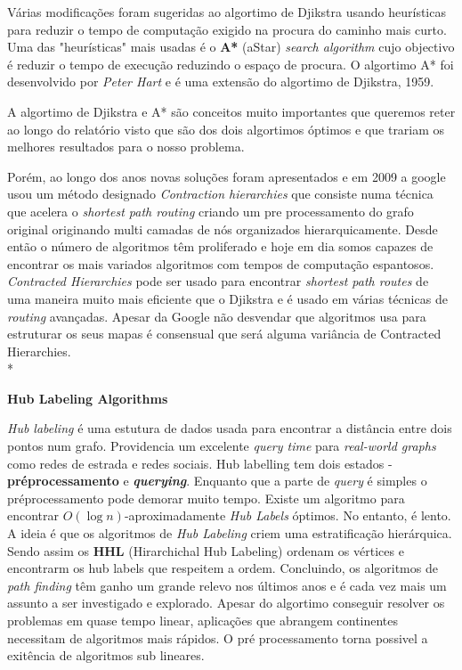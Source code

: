 \documentclass[a4paper]{article}
\begin{document}
\begin{small}

 Várias modificações foram sugeridas ao algortimo de Djikstra usando heurísticas para reduzir o tempo de computação exigido na procura do caminho mais curto. Uma das "heurísticas" mais usadas é o \textbf{A*} (aStar) \textit{search algorithm} cujo objectivo é reduzir o tempo de execução reduzindo o espaço de procura. O algortimo A* foi desenvolvido por \textit{Peter Hart} e é uma extensão do algortimo de Djikstra, 1959. 
 
 A algortimo de Djikstra e A* são conceitos muito importantes que queremos reter ao longo do relatório visto que são dos dois algortimos óptimos e que trariam os melhores resultados para o nosso problema. 
 
 Porém, ao longo dos anos novas soluções foram apresentados e em 2009 a google usou um método designado \textit{Contraction hierarchies} que consiste numa técnica que acelera o \textit{shortest path routing} criando um pre processamento do grafo original originando multi camadas de nós organizados hierarquicamente. Desde então o número de algoritmos têm proliferado e hoje em dia somos capazes de encontrar os mais variados algoritmos com tempos de computação espantosos. \textit{Contracted Hierarchies} pode ser usado para encontrar \textit{shortest path routes} de uma maneira muito mais eficiente que o Djikstra e é usado em várias técnicas de \textit{routing} avançadas. Apesar da Google não desvendar que algoritmos usa para estruturar os seus mapas é consensual que será alguma variância de Contracted Hierarchies. \\*
 \end{small}

 
 
\textbf{Hub Labeling Algorithms}


\begin{small}

\textit{Hub labeling} é uma estutura de dados usada para encontrar a distância entre dois pontos num grafo. Providencia um excelente \textit{query time} para \textit{real-world graphs} como redes de estrada e redes sociais. Hub labelling tem dois estados - \textbf{préprocessamento} e \textit{\textbf{querying}}. Enquanto que a parte de \textit{query} é simples o préprocessamento pode demorar muito tempo. Existe um algoritmo para encontrar $O (\log n)$-aproximadamente \textit{Hub Labels} óptimos. No entanto, é lento. A ideia é que os algoritmos de \textit{Hub Labeling} criem uma estratificação hierárquica. Sendo assim os \textbf{HHL} (Hirarchichal Hub Labeling) ordenam os vértices e encontrarm os hub labels que respeitem a ordem. 
Concluindo, os algoritmos de \textit{path finding} têm ganho um grande relevo nos últimos anos e é cada vez mais um assunto a ser investigado e explorado. Apesar do algortimo conseguir resolver os problemas em quase tempo linear, aplicações que abrangem continentes necessitam de algoritmos mais rápidos. O pré processamento torna possivel a exitência de algoritmos sub lineares.
\end{small}
\end{document}
